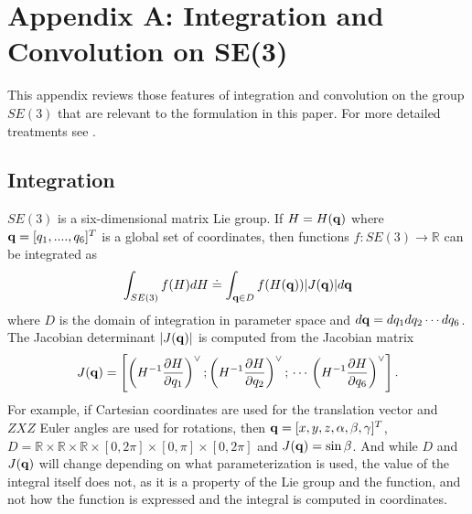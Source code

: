 \documentclass[twocolumn,10pt]{asme2ej}
\begin{document}
%
\appendix       %
\section*{Appendix A: Integration and Convolution on SE(3)}

This appendix reviews those features of integration and convolution on the group $SE(3)$ that are
relevant to the formulation in this paper. For more detailed treatments see \cite{myoldbook, vol2}.

\subsection*{Integration}

$SE(3)$ is a six-dimensional matrix Lie group. If $H = H({\bf q})$ where ${\bf q} = [q_1,....,q_6]^T$ is a global set of coordinates, then
functions $f:SE(3) \rightarrow \mathbb{R}$ can be integrated as
$$ \int_{SE(3)} f(H) dH \doteq \int_{{\bf q} \in D} f(H({\bf q})) |J({\bf q})| d{\bf q} $$
where $D$ is the domain of integration in parameter space and $d{\bf q} = dq_1 dq_2 \cdots dq_6$. 
The Jacobian determinant $|J({\bf q})|$ is computed from the Jacobian matrix 
$$ J({\bf q}) = \left[\left(H^{-1} \frac{\partial H}{\partial q_1}\right)^{\vee}; \left(H^{-1} \frac{\partial H}{\partial q_2}\right)^{\vee};\,\cdots\,
\left(H^{-1} \frac{\partial H}{\partial q_6}\right)^{\vee}\right]. $$
For example, if Cartesian coordinates are used for the translation vector and $ZXZ$ Euler angles are used
for rotations, then ${\bf q} = [x,y,z,\alpha,\beta,\gamma]^T$, $D=\mathbb{R}\times\mathbb{R}\times\mathbb{R}\times[0,2\pi]\times[0,\pi]\times[0,2\pi]$ and $J({\bf q}) = \sin \beta$. And while $D$ and $J({\bf q})$ will change depending on what parameterization is used, the value of the integral itself does not, as it is a property of the
Lie group and the function, and not how the function is expressed and the integral is computed in coordinates.
\end{document}
